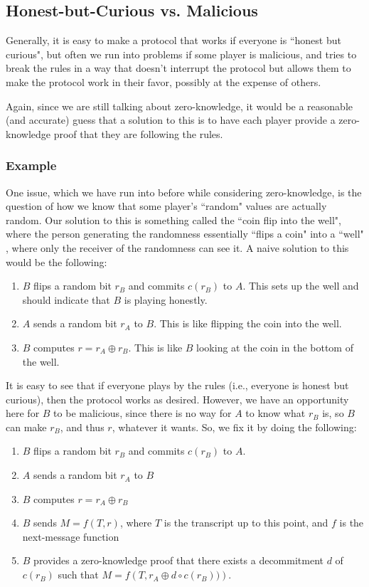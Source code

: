 \documentclass[11pt]{article}
\begin{document}
\newpage
\subsection{Honest-but-Curious vs. Malicious}
Generally, it is easy to make a protocol that works if everyone is ``honest but curious", but often we run into problems if some player is malicious, and tries to break the rules in a way that doesn't interrupt the protocol but allows them to make the protocol work in their favor, possibly at the expense of others.\smallskip

Again, since we are still talking about zero-knowledge, it would be a reasonable (and accurate) guess that a solution to this is to have each player provide a zero-knowledge proof that they are following the rules.

\subsubsection{Example}
One issue, which we have run into before while considering zero-knowledge, is the question of how we know that some player's ``random" values are actually random. Our solution to this is something called the ``coin flip into the well", where the person generating the randomness essentially ``flips a coin" into a ``well" , where only the receiver of the randomness can see it. A naive solution to this would be the following:
\begin{enumerate}
\item \(B\) flips a random bit \(r_B\) and commits \(c(r_B)\) to \(A\). This sets up the well and should indicate that \(B\) is playing honestly.
\item \(A\) sends  a random bit \(r_A\) to \(B\). This is like flipping the coin into the well.
\item \(B\) computes \(r=r_A\oplus r_B\). This is like \(B\) looking at the coin in the bottom of the well.
\end{enumerate}

It is easy to see that if everyone plays by the rules (i.e., everyone is honest but curious), then the protocol works as desired. However, we have an opportunity here for \(B\) to be malicious, since there is no way for \(A\) to know what \(r_B\) is, so \(B\) can make \(r_B\), and thus \(r\), whatever it wants. So, we fix it by doing the following:

\begin{enumerate}
\item \(B\) flips a random bit \(r_B\) and commits \(c(r_B)\) to \(A\).
\item \(A\) sends a random bit \(r_A\) to \(B\)
\item \(B\) computes \(r=r_A\oplus r_B\)
\item \(B\) sends \(M=f(T,r)\), where \(T\) is the transcript up to this point, and \(f\) is the next-message function
\item \(B\) provides a zero-knowledge proof that there exists a decommitment \(d\) of \(c(r_B)\) such that \(M=f\left(T,r_A\oplus d\circ c(r_B))\right)\).
\end{enumerate}
\end{document}
